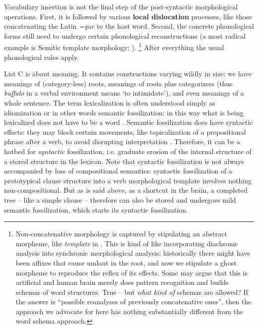 \documentclass[a4paper, oneside, scheme=plain, 12pt]{article}
\newcommand*{\concept}[1]{\textbf{#1}}
\newcommand*{\term}[1]{\emph{#1}}
\newcommand{\form}[1]{\emph{#1}}
\newcommand{\translate}[1]{`#1'}
\begin{document}
Vocabulary insertion is not the final step of the post-syntactic morphological operations.
First, it is followed by various \concept{local dislocation} processes, like those concatenating the Latin \form{=que} to the host word.
Second, the concrete phonological forms still need to undergo certain phonological reconstructions
(a most radical example is Semitic template morphology; \citealt{tucker2011morphosyntax}).%
\footnote{
    Non-concatenative morphology is captured by stipulating an abstract morpheme,
    like \term{template} in \citet{tucker2011morphosyntax}.
    This is kind of like incorporating diachronic analysis into synchronic morphological analysis:
    historically there might have been affixes that cause umlaut in the root,
    and now we stipulate a ghost morpheme to reproduce the reflex of its effects.
    Some may argue that this is artificial and human brain merely does pattern recognition and builds schemas of word structures.
    True -- but \emph{what kind of} schemas are allowed?
    If the answer is ``possible reanalyses of previously concatenative ones'',
    then the approach we advocate for here has nothing substantially different from the word schema approach.
}
After everything the usual phonological rules apply.

List C is about meaning. It contains constructions varying wildly in size:
we have meanings of (category-less) roots,
meanings of roots plus categorizers (thus \form{buffalo} in a verbal environment means \translate{to intimidate}),
and even meanings of a whole sentence.
The term lexicalization is often understood simply as idiomization or in other words semantic fossilization:
in this way what is being lexicalized does not have to be a word \citep{harley1999distributed}.
Semantic fossilization does have syntactic effects:
they may block certain movements, like topicalization of a prepositional phrase 
after a verb, to avoid disrupting interpretation \citep{nediger2017unifying}.
Therefore, it can be a hotbed for \emph{syntactic} fossilization,
i.e. graduate erosion of the internal structure of a stored structure in the lexicon.
Note that syntactic fossilization is not always accompanied by loss of compositional semantics:
syntactic fossilization of a prototypical clause structure 
into a verb morphological template involves nothing non-compositional.
But as is said above, as a shortcut in the brain,
a completed tree -- like a simple clause -- therefore can also be stored
and undergoes mild semantic fossilization,
which starts its syntactic fossilization.
\end{document}
